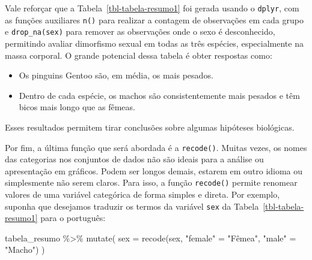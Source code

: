 \documentclass[
  12pt,
  letterpaper,
  DIV=11,
  numbers=noendperiod]{scrreprt}
\newenvironment{Shaded}{\begin{snugshade}}{\end{snugshade}}
\newcommand{\AttributeTok}[1]{\textcolor[rgb]{0.40,0.45,0.13}{#1}}
\newcommand{\FunctionTok}[1]{\textcolor[rgb]{0.28,0.35,0.67}{#1}}
\newcommand{\NormalTok}[1]{\textcolor[rgb]{0.00,0.23,0.31}{#1}}
\newcommand{\OtherTok}[1]{\textcolor[rgb]{0.00,0.23,0.31}{#1}}
\newcommand{\SpecialCharTok}[1]{\textcolor[rgb]{0.37,0.37,0.37}{#1}}
\newcommand{\StringTok}[1]{\textcolor[rgb]{0.13,0.47,0.30}{#1}}
\providecommand{\tightlist}{%
  \setlength{\itemsep}{0pt}\setlength{\parskip}{0pt}}\usepackage{longtable,booktabs,array}
\begin{document}
\noindent Vale reforçar que a Tabela~\ref{tbl-tabela-resumo1} foi gerada
usando o \texttt{dplyr}, com as funções auxiliares \texttt{n()} para
realizar a contagem de observações em cada grupo e
\texttt{drop\_na(sex)} para remover as observações onde o sexo é
desconhecido, permitindo avaliar dimorfismo sexual em todas as três
espécies, especialmente na massa corporal. O grande potencial dessa
tabela é obter respostas como:

\begin{itemize}
\tightlist
\item
  Os pinguins Gentoo são, em média, os mais pesados.
\item
  Dentro de cada espécie, os machos são consistentemente mais pesados e
  têm bicos mais longo que as fêmeas.
\end{itemize}

\noindent Esses resultados permitem tirar conclusões sobre algumas
hipóteses biológicas.

Por fim, a última função que será abordada é a \texttt{recode()}. Muitas
vezes, os nomes das categorias nos conjuntos de dados não são ideais
para a análise ou apresentação em gráficos. Podem ser longos demais,
estarem em outro idioma ou simplesmente não serem claros. Para isso, a
função \texttt{recode()} permite renomear valores de uma variável
categórica de forma simples e direta. Por exemplo, suponha que desejamos
traduzir os termos da variável \texttt{sex} da
Tabela~\ref{tbl-tabela-resumo1} para o português:

\begin{Shaded}
\begin{Highlighting}[]
\NormalTok{tabela\_resumo }\SpecialCharTok{\%\textgreater{}\%} 
  \FunctionTok{mutate}\NormalTok{(}
    \AttributeTok{sex =} \FunctionTok{recode}\NormalTok{(sex,}
                 \StringTok{"female"} \OtherTok{=} \StringTok{"Fêmea"}\NormalTok{,}
                 \StringTok{"male"} \OtherTok{=} \StringTok{"Macho"}\NormalTok{)}
\NormalTok{  ) }
\end{Highlighting}
\end{Shaded}
\end{document}
